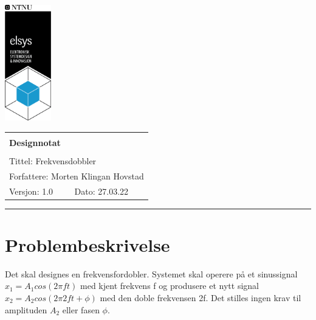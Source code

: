\documentclass[a4paper,11pt,norsk]{article}
\begin{document}
\begin{minipage}[c]{0.15\textwidth}
\includegraphics[width=2.0cm]{elsys_pos_staaende_ntnu}  
\end{minipage}
\begin{minipage}[c]{0.85\textwidth}

\renewcommand{\arraystretch}{1.7}
\large 
\begin{tabularx}{\textwidth}{|X|X|}
\hline
\multicolumn{2}{|l|}{} \\
\multicolumn{2}{|l|}{\huge \textbf{Designnotat}} \\
\multicolumn{2}{|l|}{}  \\
\hline
\multicolumn{2}{|l|}{Tittel: 
Frekvensdobbler
} \\
\hline
\multicolumn{2}{|l|}{Forfattere: 
Morten Klingan Hovstad
} \\
\hline
Versjon: 1.0 & Dato: 27.03.22
\\
\hline 
\end{tabularx}
\end{minipage}
\normalsize


\setlength{\parskip}{0ex}
\renewcommand{\baselinestretch}{0.1}\normalsize
\tableofcontents
\renewcommand{\baselinestretch}{1.00}\normalsize
\setlength{\parskip}{2ex}
\rule{\textwidth}{1pt}

\section{Problembeskrivelse}
\label{sec:innledning}

Det skal designes en frekvensfordobler. Systemet skal operere på et sinussignal $x_1 = A_1 cos(2\pi ft)$ med kjent frekvens f og produsere et nytt signal $x_2 = A_2 cos(2\pi2f t+\phi)$ med den doble frekvensen 2f. Det stilles ingen krav til amplituden $A_2$ eller fasen $\phi$.
\end{document}
